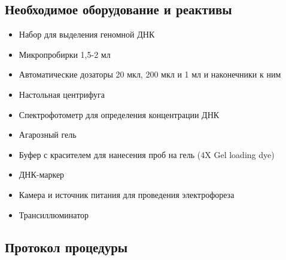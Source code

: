 
\subsection*{Необходимое оборудование и реактивы}
\begin{itemize}
\item Набор для выделения геномной ДНК
\item Микропробирки 1,5-2 мл
\item Автоматические дозаторы 20 мкл, 200 мкл и 1 мл и наконечники к ним
\item Настольная центрифуга
\item Спектрофотометр для определения концентрации ДНК
\item Агарозный гель
\item Буфер с красителем для нанесения проб на гель (4X Gel loading dye)
\item ДНК-маркер
\item Камера и источник питания для проведения электрофореза
\item Трансиллюминатор
\end{itemize}

\subsection*{Протокол процедуры}

